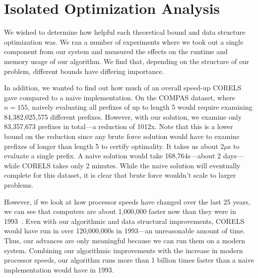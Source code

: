 \section{Isolated Optimization Analysis}
We wished to determine how helpful each theoretical bound and data structure optimization was.
We ran a number of experiments where we took out a single component from our system and measured the effects on the runtime and memory usage of our algorithm.
We find that, depending on the structure of our problem, different bounds have differing importance.

In addition, we wanted to find out how much of an overall speed-up CORELS gave compared to a naive implementation.
On the COMPAS dataset, where $n = 155$, naively evaluating all prefixes of up to length 5 would require examining 84,382,025,575 different prefixes.
However, with our solution, we examine only 83,357,673 prefixes in total---a reduction of 1012x.
Note that this is a lower bound on the reduction since any brute force solution would have to examine prefixes of longer than length 5 to certify optimality.
It takes us about 2$\mu$s to evaluate a single prefix.
A naive solution would take 168,764s---about 2 days---while CORELS takes only 2 minutes.
While the naive solution will eventually complete for this dataset, it is clear that brute force wouldn't scale to larger problems.

However, if we look at how processor speeds have changed over the last 25 years, we can see that computers are about 1,000,000 faster now than they were in 1993~\cite{Supercomputer}.
Even with our algorithmic and data structural improvements, CORELS would have run in over 120,000,000s in 1993---an unreasonable amount of time.
Thus, our advances are only meaningful because we can run them on a modern system.
Combining our algorithmic improvements with the increase in modern processor speeds, our algorithm runs more than 1 billion times faster than a naive implementation would have in 1993.

